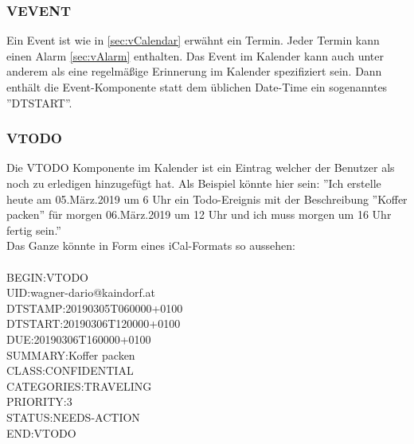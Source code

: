 \subsubsection{VEVENT}
\label{sec:vEvent} 
Ein Event ist wie in \ref{sec:vCalendar} erwähnt ein Termin. Jeder Termin kann einen Alarm \ref{sec:vAlarm} enthalten. Das Event im Kalender kann auch unter anderem als eine regelmäßige Erinnerung im Kalender spezifiziert sein. Dann enthält die Event-Komponente statt dem üblichen Date-Time ein sogenanntes ''DTSTART''.
\subsubsection{VTODO}
\label{sec:vTodo} 
Die VTODO Komponente im Kalender ist ein Eintrag welcher der Benutzer als noch zu erledigen hinzugefügt hat. Als Beispiel könnte hier sein: ''Ich erstelle heute am 05.März.2019 um 6 Uhr ein Todo-Ereignis mit der Beschreibung ''Koffer packen'' für morgen 06.März.2019 um 12 Uhr und ich muss morgen um 16 Uhr fertig sein.'' \\
Das Ganze könnte in Form eines iCal-Formats so aussehen: \\ \\
  BEGIN:VTODO \\
  UID:wagner-dario@kaindorf.at\\
  DTSTAMP:20190305T060000+0100\\
  DTSTART:20190306T120000+0100\\
  DUE:20190306T160000+0100\\
  SUMMARY:Koffer packen\\
  CLASS:CONFIDENTIAL\\
  CATEGORIES:TRAVELING\\
  PRIORITY:3\\
  STATUS:NEEDS-ACTION\\
  END:VTODO\\
  
